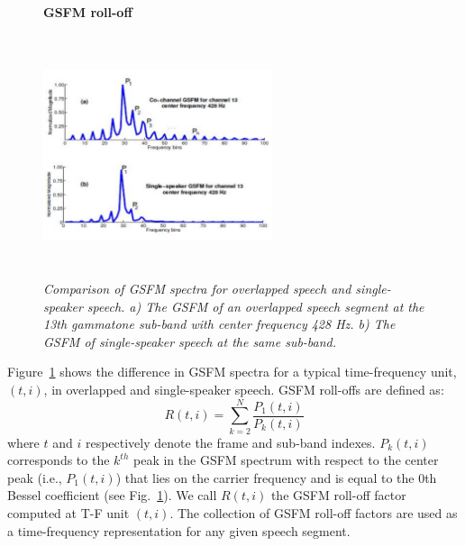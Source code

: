 {\begin{figure}[h!]
	\centering
	\hspace{-1mm}
	\textbf{GSFM roll-off}\par\medskip
	\includegraphics[height = 2.8in, width=0.6\textwidth]{figures/gsfm_rolloff}
	\vspace{-1mm}
	\caption{\it Comparison of GSFM spectra for overlapped speech and single-speaker speech. a) The GSFM of an overlapped speech segment at the 13th gammatone sub-band with center frequency 428 Hz. b) The GSFM of single-speaker speech at the same sub-band.}
	\vspace{0mm}
	\label{fig:gsfm_rolloff}
\end{figure}

Figure~\ref{fig:gsfm_rolloff} shows the difference in GSFM spectra for a typical time-frequency unit, $(t,i)$, in overlapped and single-speaker speech. 
GSFM roll-offs are defined as: 
\begin{equation}
\label{eq:gsfm_rolloff}
R(t,i) = \sum\limits_{k=2}^{N} \frac{P_1(t,i)}{P_k(t,i)}
\end{equation}
where $t$ and $i$ respectively denote the frame and sub-band indexes. 
$P_k(t, i)$ corresponds to the $k^{th}$ peak in the GSFM spectrum with respect to the center peak (i.e., $P_1(t,i)$) that lies on the carrier frequency and is equal to the 0th Bessel coefficient (see Fig.~\ref{fig:gsfm_rolloff}). 
We call $R(t, i)$ the GSFM roll-off factor computed at T-F unit $(t, i)$. 
The collection of GSFM roll-off factors are used as a time-frequency representation for any given speech segment. 


}
